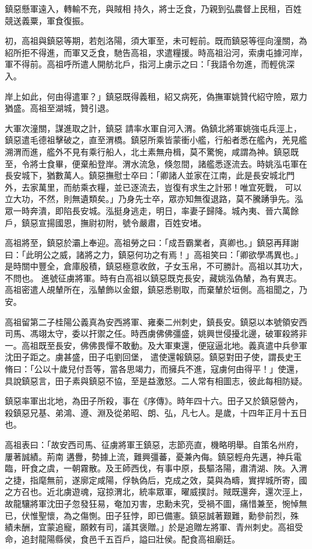 \begin{pinyinscope}
 鎮惡懸軍遠入，轉輸不充，與賊相
 持久，將士乏食，乃親到弘農督上民租，百姓競送義粟，軍食復振。



 初，高祖與鎮惡等期，若剋洛陽，須大軍至，未可輕前。既而鎮惡等徑向潼關，為紹所拒不得進，而軍又乏食，馳告高祖，求遣糧援。時高祖沿河，索虜屯據河岸，軍不得前。高祖呼所遣人開舫北戶，指河上虜示之曰：「我語令勿進，而輕佻深入。



 岸上如此，何由得遣軍？」鎮惡既得義租，紹又病死，偽撫軍姚贊代紹守險，眾力猶盛。高祖至湖城，贊引退。



 大軍次潼關，謀進取之計，鎮惡
 請率水軍自河入渭。偽鎮北將軍姚強屯兵涇上，鎮惡遣毛德祖擊破之，直至渭橋。鎮惡所乘皆蒙衝小艦，行船者悉在艦內，羌見艦溯渭而進，艦外不見有乘行船人，北土素無舟楫，莫不驚惋，咸謂為神。鎮惡既至，令將士食畢，便棄船登岸。渭水流急，倏忽間，諸艦悉逐流去。時姚泓屯軍在長安城下，猶數萬人。鎮惡撫慰士卒曰：「卿諸人並家在江南，此是長安城北門外，去家萬里，而舫乘衣糧，並已逐流去，豈復有求生之計邪！唯宜死戰，
 可以立大功，不然，則無遺類矣。」乃身先士卒，眾亦知無復退路，莫不騰踴爭先。泓眾一時奔潰，即陷長安城。泓挺身逃走，明日，率妻子歸降。城內夷、晉六萬餘戶，鎮惡宣揚國恩，撫尉初附，號令嚴肅，百姓安堵。



 高祖將至，鎮惡於灞上奉迎。高祖勞之曰：「成吾霸業者，真卿也。」鎮惡再拜謝曰：「此明公之威，諸將之力，鎮惡何功之有焉！」高祖笑曰：「卿欲學馮異也。」是時關中豐全，倉庫殷積，鎮惡極意收斂，子女玉帛，不可勝計。高祖以其功大，不問也。
 進號征虜將軍。時有白高祖以鎮惡既克長安，藏姚泓偽輦，為有異志。高祖密遣人覘輦所在，泓輦飾以金銀，鎮惡悉剔取，而棄輦於垣側。高祖聞之，乃安。



 高祖留第二子桂陽公義真為安西將軍、雍秦二州刺史，鎮長安。鎮惡以本號領安西司馬、馮翊太守，委以扞禦之任。時西虜佛佛彊盛，姚興世侵擾北邊，破軍殺將非一。高祖既至長安，佛佛畏憚不敢動。及大軍東還，便寇逼北地。義真遣中兵參軍沈田子距之。虜甚盛，田子屯劉回堡，
 遣使還報鎮惡。鎮惡對田子使，謂長史王脩曰：「公以十歲兒付吾等，當各思竭力，而擁兵不進，寇虜何由得平！」使還，具說鎮惡言，田子素與鎮惡不協，至是益激怒。二人常有相圖志，彼此每相防疑。



 鎮惡率軍出北地，為田子所殺，事在《序傳》。時年四十六。田子又於鎮惡營內，殺鎮惡兄基、弟鴻、遵、淵及從弟昭、朗、弘，凡七人。是歲，十四年正月十五日也。



 高祖表曰：「故安西司馬、征虜將軍王鎮惡，志節亮直，機略明舉。自策名州府，屢著誠績。荊南
 遘釁，勢據上流，難興彊蕃，憂兼內侮。鎮惡輕舟先邁，神兵電臨，旰食之虞，一朝霧散。及王師西伐，有事中原，長驅洛陽，肅清湖、陜。入渭之捷，指麾無前，遂廓定咸陽，俘執偽后，克成之效，莫與為疇，實捍城所寄，國之方召也。近北虜遊魂，寇掠渭北，統率眾軍，曜威撲討。賊既還奔，還次涇上，故龍驤將軍沈田子忽發狂易，奄加刃害，忠勳未究，受禍不圖，痛惜兼至，惋悼無已，伏惟聖懷，為之傷惻。田子狂悖，即已備憲。鎮惡誠著艱難，勳參前烈，殊
 績未酬，宜蒙追寵，願敕有司，議其褒贈。」於是追贈左將軍、青州刺史。高祖受命，追封龍陽縣侯，食邑千五百戶，謚曰壯侯。配食高祖廟廷。




\end{pinyinscope}
